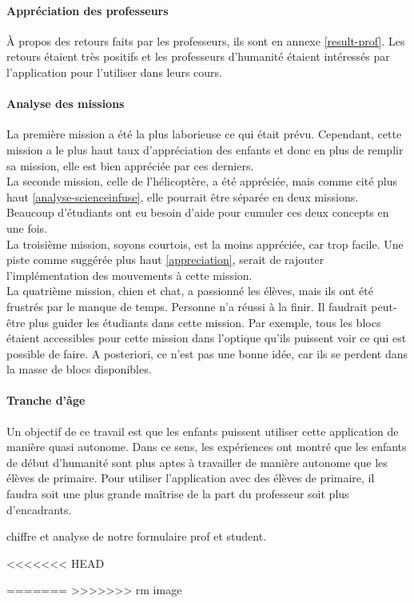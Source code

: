 \paragraph{Appréciation des professeurs}
À propos des retours faits par les professeurs, ils sont en annexe \ref{result-prof}. Les retours étaient très positifs et les professeurs d'humanité étaient intéressés par l'application pour l'utiliser dans leurs cours.

\paragraph{Analyse des missions}
La première mission a été la plus laborieuse ce qui était prévu. Cependant, cette mission a le plus haut taux d'appréciation des enfants et donc en plus de remplir sa mission, elle est bien appréciée par ces derniers.\\

La seconde mission, celle de l'hélicoptère, a été appréciée, mais comme cité plus haut \ref{analyse-scienceinfuse}, elle pourrait être séparée en deux missions. Beaucoup d'étudiants ont eu besoin d'aide pour cumuler ces deux concepts en une fois.\\

La troisième mission, soyons courtois, est la moins appréciée, car trop facile. Une piste comme suggérée plus haut \ref{appreciation}, serait de rajouter l'implémentation des mouvements à cette mission.\\

La quatrième mission, chien et chat, a passionné les élèves, mais ils ont été frustrés par le manque de temps. Personne n'a réussi à la finir. Il faudrait peut-être plus guider les étudiants dans cette mission. Par exemple, tous les blocs étaient accessibles pour cette mission dans l'optique qu'ils puissent voir ce qui est possible de faire. A posteriori, ce n'est pas une bonne idée, car ils se perdent dans la masse de blocs disponibles.

\paragraph{Tranche d'âge}
Un objectif de ce travail est que les enfants puissent utiliser cette application de manière quasi autonome. Dans ce sens, les expériences ont montré que les enfants de début d'humanité sont plus aptes à travailler de manière autonome que les élèves de primaire.
Pour utiliser l'application avec des élèves de primaire, il faudra soit une plus grande maîtrise de la part du professeur soit plus d'encadrants.






chiffre et analyse de notre formulaire prof et student.












<<<<<<< HEAD


=======
>>>>>>> rm image
